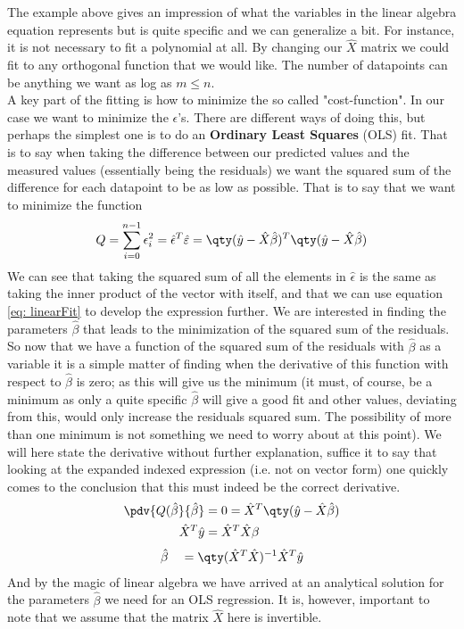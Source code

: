 The example above gives an impression of what the variables in the linear algebra equation represents but is quite specific and we can generalize a bit. For instance, it is not necessary to fit a polynomial at all. By changing our $\hat{X}$ matrix we could fit to any orthogonal function that we would like. The number of datapoints can be anything we want as log as $m\leq n$.\\

\pagebreak
A key part of the fitting is how to minimize the so called "cost-function". In our case we want to minimize the $\epsilon$'s. There are different ways of doing this, but perhaps the simplest one is to do an \textbf{Ordinary Least Squares} (OLS) fit. That is to say when taking the difference between our predicted values and the measured values (essentially being the residuals) we want the squared sum of the difference for each datapoint to be as low as possible. That is to say that we want to minimize the function
\begin{align*}
	Q = \sum_{i=0}^{n-1}\epsilon_i^2 = \hat{\epsilon}^T\hat{\varepsilon} = \qty(\hat{y}-\hat{X}\hat{\beta})^T\qty(\hat{y}-\hat{X}\hat{\beta})
\end{align*}
We can see that taking the squared sum of all the elements in $\hat{\epsilon}$ is the same as taking the inner product of the vector with itself, and that we can use equation \ref{eq: linearFit} to develop the expression further. We are interested in finding the parameters $\hat{\beta}$ that leads to the minimization of the squared sum of the residuals. So now that we have a function of the squared sum of the residuals with $\hat{\beta}$ as a variable it is a simple matter of finding when the derivative of this function with respect to $\hat{\beta}$ is zero; as this will give us the minimum (it must, of course, be a minimum as only a quite specific $\hat{\beta}$ will give a good fit and other values, deviating from this, would only increase the residuals squared sum. The possibility of more than one minimum is not something we need to worry about at this point). We will here state the derivative without further explanation, suffice it to say that looking at the expanded indexed expression (i.e. not on vector form) one quickly comes to the conclusion that this must indeed be the correct derivative.
\begin{align*}
	\pdv{Q(\hat{\beta}}{\hat{\beta}} &= 0 = \hat{X}^T\qty(\hat{y}-\hat{X}\hat{\beta})\\
	\hat{X}^T\hat{y} &= \hat{X}^T\hat{X}\beta
\end{align*}
\begin{align}\label{eq: beta}
	\hat{\beta} \quad= \qty(\hat{X}^T\hat{X})^{-1}\hat{X}^T\hat{y}
\end{align}
And by the magic of linear algebra we have arrived at an analytical solution for the parameters $\hat{\beta}$ we need for an OLS regression. It is, however, important to note that we assume that the matrix $\hat{X}$ here is invertible.

